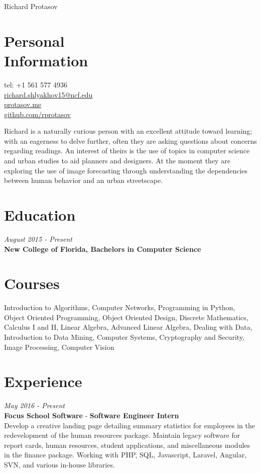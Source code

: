 \documentclass[margin,line,a4paper]{resume}
\begin{document}
{\sc \Huge Richard Protasov}
\begin{resume}
    \vspace{0.5cm}

    \section{\mysidestyle Personal\\Information}%
    tel: +1 561 577 4936 \\
    \href{mailto:richard.shlyakhov15@ncf.edu}{richard.shlyakhov15@ncf.edu} \\
    \href{http://protasov.me}{protasov.me}\\
    \href{https://github.com/rprotasov}{github.com/rprotasov}
    
     Richard is a naturally curious person with an excellent attitude toward learning; with an eagerness to delve further, often they are asking questions about concerns regarding readings. An interest of theirs is the use of topics in computer science and urban studies to aid planners and designers. At the moment they are exploring the use of image forecasting through understanding the dependencies between human behavior and an urban streetscape.
    
    \section{\mysidestyle Education}
        \textit{August 2015 - Present}\\
        \textbf{New College of Florida, Bachelors in Computer Science}
        
    \section{\mysidestyle Courses}
        Introduction to Algorithms, Computer Networks, Programming in Python, Object Oriented Programming, Object Oriented Design, Discrete Mathematics, Calculus I and II, Linear Algebra, Advanced Linear Algebra, Dealing with Data, Introduction to Data Mining, Computer Systems, Cryptography and Security, Image Processing, Computer Vision
    
    \section{\mysidestyle Experience}
        \textit{May 2016 - Present}\\
        \textbf{Focus School Software} - \textbf{Software Engineer Intern}\\
        Develop a creative landing page detailing summary statistics for employees in the redevelopment of the human resources package. Maintain legacy software for report cards, human resources, student applications, and miscellaneous modules in the finance package.  Working with PHP, SQL, Javascript, Laravel, Angular, SVN, and various in-house libraries. 
            

\end{resume}
\end{document}
